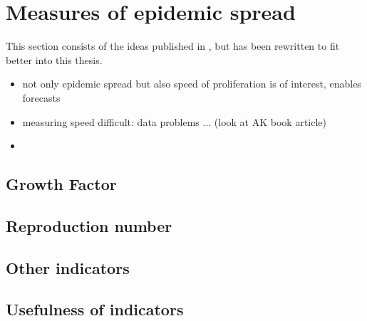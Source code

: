 \section{Measures of epidemic spread}
\label{sec:measures_of_epidemic_spread}
This section consists of the ideas published in \cite{Heyder2023Measures}, but has been rewritten to fit better into this thesis.

\begin{itemize}
    \item not only epidemic spread but also speed of proliferation is of interest, enables forecasts
    \item measuring speed difficult: data problems ... (look at AK book article)
    \item 
\end{itemize}

\subsection{Growth Factor}
\label{subsec:growth_factor}
\subsection{Reproduction number}
\label{subsec:reproduction_number}

\subsection{Other indicators}
\label{subsec:other_indicat}

\subsection{Usefulness of indicators}
\label{subsec:usefulness_of_indicators}

